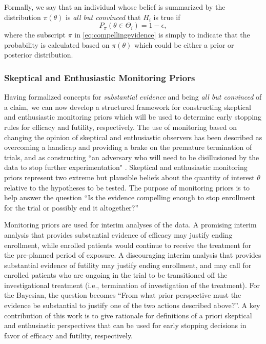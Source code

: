 \documentclass[useAMS,usenatbib,referee]{biom}
\begin{document}
Formally, we say that an individual whose belief is summarized by the distribution $\pi\left(\theta\right)$ is \textit{all but convinced} that $H_i$ is true if 
\begin{equation}\label{eq:compellingevidence}
		P_\pi(\theta\in\Theta_i)= 1-\epsilon,
\end{equation} 
where the subscript $\pi$ in \eqref{eq:compellingevidence} is simply to indicate that the probability is calculated based on $\pi\left(\theta\right)$ which could be either a prior
or posterior distribution.

\subsubsection{Skeptical and Enthusiastic Monitoring Priors}\label{sec:MP}
Having formalized concepts for \textit{substantial evidence} and  being \textit{all but convinced} of a claim, 
we can now develop a structured framework for constructing skeptical and enthusiastic monitoring priors which will be used to 
determine early stopping rules for efficacy and futility, respectively.
%
The use of monitoring based on changing the opinion of skeptical and enthusiastic observers has been described as overcoming a 
handicap \citep{Freedman1989} and providing a brake \citep{Fayers1997} on the premature termination of trials, and as 
constructing ``an adversary who will need to be disillusioned by the data to stop further experimentation" \citep{Spiegelhalter1994}. 
%
Skeptical and enthusiastic monitoring priors represent two extreme but plausible beliefs about the quantity of interest $\theta$ relative to the hypotheses to be tested.
%
The purpose of monitoring priors is to help answer the question ``Is the evidence compelling enough to stop enrollment for the trial or possibly end it altogether?''

Monitoring priors are used for interim analyses of the data. 
A promising interim analysis that provides substantial evidence of efficacy may justify ending enrollment, while enrolled patients would continue 
to receive the treatment for the pre-planned period of exposure. 
%
A discouraging interim analysis that provides substantial evidence of futility may justify ending enrollment, and may call for enrolled patients 
who are ongoing in the trial to be transitioned off the investigational treatment (i.e., termination of investigation of the treatment). 
%
For the Bayesian, the question becomes ``From what prior perspective must the evidence be substantial to justify one of the two actions described above?''.
%
A key contribution of this work is to give rationale for definitions of a priori skeptical and enthusiastic perspectives that can be used for early stopping decisions 
in favor of efficacy and futility, respectively.
\end{document}
